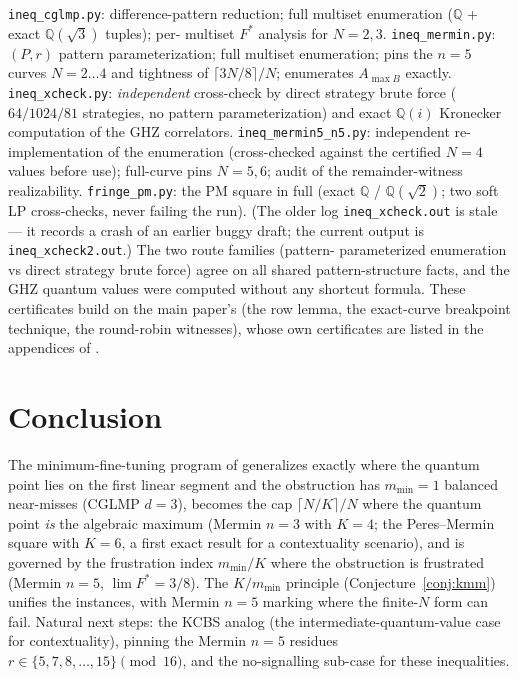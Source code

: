 \documentclass[aps,pra,reprint,superscriptaddress,floatfix]{revtex4-2}
\begin{document}
\texttt{ineq\_cglmp.py}: difference-pattern reduction; full multiset
enumeration ($\mathbb{Q}$ + exact $\mathbb{Q}(\sqrt{3})$ tuples); per-
multiset $F^{*}$ analysis for $N=2,3$. \texttt{ineq\_mermin.py}:
$(P,r)$ pattern parameterization; full multiset enumeration; pins the
$n=5$ curves $N=2\dots 4$ and tightness of $\lceil 3N/8\rceil/N$;
enumerates $A_{\max B}$ exactly. \texttt{ineq\_xcheck.py}:
\emph{independent} cross-check by direct strategy brute force
($64/1024/81$ strategies, no pattern parameterization) and exact
$\mathbb{Q}(i)$ Kronecker computation of the GHZ correlators.
\texttt{ineq\_mermin5\_n5.py}: independent re-implementation of the
enumeration (cross-checked against the certified $N=4$ values before
use); full-curve pins $N=5,6$; audit of the remainder-witness
realizability. \texttt{fringe\_pm.py}: the PM square in full (exact
$\mathbb{Q}$ / $\mathbb{Q}(\sqrt{2})$; two soft LP cross-checks, never
failing the run). (The older log \texttt{ineq\_xcheck.out} is stale --- it
records a crash of an earlier buggy draft; the current output is
\texttt{ineq\_xcheck2.out}.) The two route families (pattern-
parameterized enumeration vs direct strategy brute force) agree on all
shared pattern-structure facts, and the GHZ quantum values were computed
without any shortcut formula. These certificates build on the main paper's
(the row lemma, the exact-curve breakpoint technique, the round-robin
witnesses), whose own certificates are listed in the appendices
of \cite{mainpaper2026}.

\section{Conclusion}
\label{sec:concl}

The minimum-fine-tuning program of \cite{mainpaper2026} generalizes
exactly where the quantum point lies on the first linear segment and the
obstruction has $m_{\min}=1$ balanced near-misses ({CGLMP} $d=3$), becomes
the cap $\lceil N/K\rceil/N$ where the quantum point \emph{is} the
algebraic maximum ({Mermin} $n=3$ with $K=4$; the Peres--Mermin square
with $K=6$, a first exact result for a contextuality scenario), and is
governed by the frustration index $m_{\min}/K$ where the obstruction is
frustrated ({Mermin} $n=5$, $\lim F^{*}=3/8$). The $K/m_{\min}$
principle (Conjecture~\ref{conj:kmm}) unifies the instances, with
{Mermin} $n=5$ marking where the finite-$N$ form can fail. Natural next
steps: the {KCBS} analog (the intermediate-quantum-value case for
contextuality), pinning the {Mermin} $n=5$ residues $r\in\{5,7,8,\dots,
15\}\pmod{16}$, and the no-signalling sub-case for these inequalities.
\end{document}
